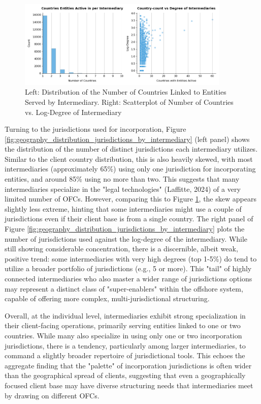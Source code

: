 \begin{figure}[htbp]
    \centering
    \includegraphics[width=0.9\textwidth]{images/Geography_Distribution_of_Countries_by_Intermediary.png} %
    \caption{Left: Distribution of the Number of Countries Linked to Entities Served by Intermediary. Right: Scatterplot of Number of Countries vs. Log-Degree of Intermediary}
    \label{fig:geography_distribution_countries_by_intermediary}
\end{figure}

Turning to the jurisdictions used for incorporation, Figure \ref{fig:geography_distribution_jurisdictions_by_intermediary} (left panel) shows the distribution of the number of distinct jurisdictions each intermediary utilizes. Similar to the client country distribution, this is also heavily skewed, with most intermediaries (approximately 65\%) using only one jurisdiction for incorporating entities, and around 85\% using no more than two. This suggests that many intermediaries specialize in the "legal technologies" (Laffitte, 2024) of a very limited number of OFCs. However, comparing this to Figure \ref{fig:geography_distribution_countries_by_intermediary}, the skew appears slightly less extreme, hinting that some intermediaries might use a couple of jurisdictions even if their client base is from a single country. The right panel of Figure \ref{fig:geography_distribution_jurisdictions_by_intermediary} plots the number of jurisdictions used against the log-degree of the intermediary. While still showing considerable concentration, there is a discernible, albeit weak, positive trend: some intermediaries with very high degrees (top 1-5\%) do tend to utilize a broader portfolio of jurisdictions (e.g., 5 or more). This "tail" of highly connected intermediaries who also master a wider range of jurisdictions options may represent a distinct class of "super-enablers" within the offshore system, capable of offering more complex, multi-jurisdictional structuring.

Overall, at the individual level, intermediaries exhibit strong specialization in their client-facing operations, primarily serving entities linked to one or two countries. While many also specialize in using only one or two incorporation jurisdictions, there is a tendency, particularly among larger intermediaries, to command a slightly broader repertoire of jurisdictional tools. This echoes the aggregate finding that the "palette" of incorporation jurisdictions is often wider than the geographical spread of clients, suggesting that even a geographically focused client base may have diverse structuring needs that intermediaries meet by drawing on different OFCs.

